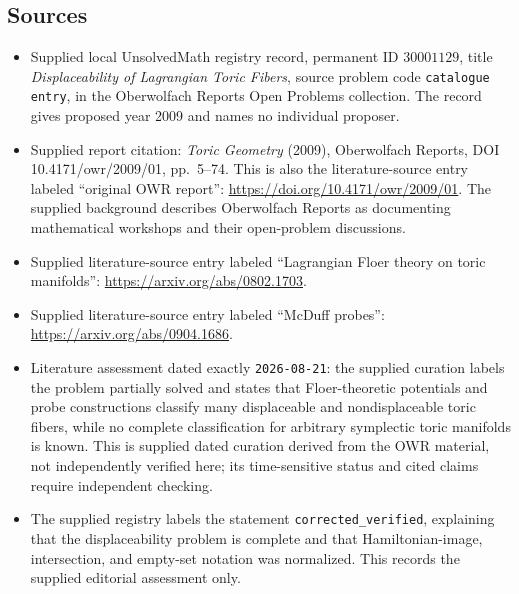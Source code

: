 \documentclass[11pt]{article}
\begin{document}
\subsection{Sources}
\begin{itemize}
\item Supplied local UnsolvedMath registry record, permanent ID \(30001129\), title \emph{Displaceability of Lagrangian Toric Fibers}, source problem code \texttt{catalogue entry}, in the Oberwolfach Reports Open Problems collection. The record gives proposed year 2009 and names no individual proposer.
\item Supplied report citation: \emph{Toric Geometry} (2009), Oberwolfach Reports, DOI 10.4171/owr/2009/01, pp.\ 5--74. This is also the literature-source entry labeled ``original OWR report'': \url{https://doi.org/10.4171/owr/2009/01}. The supplied background describes Oberwolfach Reports as documenting mathematical workshops and their open-problem discussions.
\item Supplied literature-source entry labeled ``Lagrangian Floer theory on toric manifolds'': \url{https://arxiv.org/abs/0802.1703}.
\item Supplied literature-source entry labeled ``McDuff probes'': \url{https://arxiv.org/abs/0904.1686}.
\item Literature assessment dated exactly \texttt{2026-08-21}: the supplied curation labels the problem partially solved and states that Floer-theoretic potentials and probe constructions classify many displaceable and nondisplaceable toric fibers, while no complete classification for arbitrary symplectic toric manifolds is known. This is supplied dated curation derived from the OWR material, not independently verified here; its time-sensitive status and cited claims require independent checking.
\item The supplied registry labels the statement \texttt{corrected\_verified}, explaining that the displaceability problem is complete and that Hamiltonian-image, intersection, and empty-set notation was normalized. This records the supplied editorial assessment only.
\end{itemize}
\end{document}

